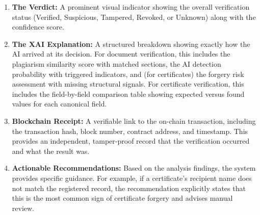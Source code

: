             \begin{enumerate}
                \item \textbf{The Verdict:} A prominent visual indicator showing the overall verification status (Verified, Suspicious, Tampered, Revoked, or Unknown) along with the confidence score.
            
                \item \textbf{The XAI Explanation:} A structured breakdown showing exactly how the AI arrived at its decision. For document verification, this includes the plagiarism similarity score with matched sections, the AI detection probability with triggered indicators, and (for certificates) the forgery risk assessment with missing structural signals. For certificate verification, this includes the field-by-field comparison table showing expected versus found values for each canonical field.
            
                \item \textbf{Blockchain Receipt:} A verifiable link to the on-chain transaction, including the transaction hash, block number, contract address, and timestamp. This provides an independent, tamper-proof record that the verification occurred and what the result was.
            
                \item \textbf{Actionable Recommendations:} Based on the analysis findings, the system provides specific guidance. For example, if a certificate's recipient name does not match the registered record, the recommendation explicitly states that this is the most common sign of certificate forgery and advises manual review.
            \end{enumerate}
        
        





    
